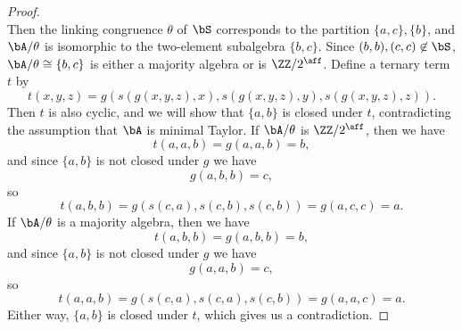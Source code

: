 \begin{proof}
\[\]
Then the linking congruence $\theta$ of $\bS$ corresponds to the partition $\{a,c\}, \{b\}$, and $\bA/\theta$ is isomorphic to the two-element subalgebra $\{b,c\}$. Since $(b,b), (c,c) \not\in \bS$, $\bA/\theta \cong \{b,c\}$ is either a majority algebra or is $\ZZ/2^{\aff}$. Define a ternary term $t$ by
\[
t(x,y,z) = g(s(g(x,y,z),x), s(g(x,y,z),y), s(g(x,y,z),z)).
\]
Then $t$ is also cyclic, and we will show that $\{a,b\}$ is closed under $t$, contradicting the assumption that $\bA$ is minimal Taylor. If $\bA/\theta$ is $\ZZ/2^{\aff}$, then we have
\[
t(a,a,b) = g(a,a,b) = b,
\]
and since $\{a,b\}$ is not closed under $g$ we have
\[
g(a,b,b) = c,
\]
so
\[
t(a,b,b) = g(s(c,a), s(c,b), s(c,b)) = g(a, c, c) = a.
\]
If $\bA/\theta$ is a majority algebra, then we have
\[
t(a,b,b) = g(a,b,b) = b,
\]
and since $\{a,b\}$ is not closed under $g$ we have
\[
g(a,a,b) = c,
\]
so
\[
t(a,a,b) = g(s(c,a), s(c,a), s(c,b)) = g(a,a,c) = a.
\]
Either way, $\{a,b\}$ is closed under $t$, which gives us a contradiction.


\end{proof}
